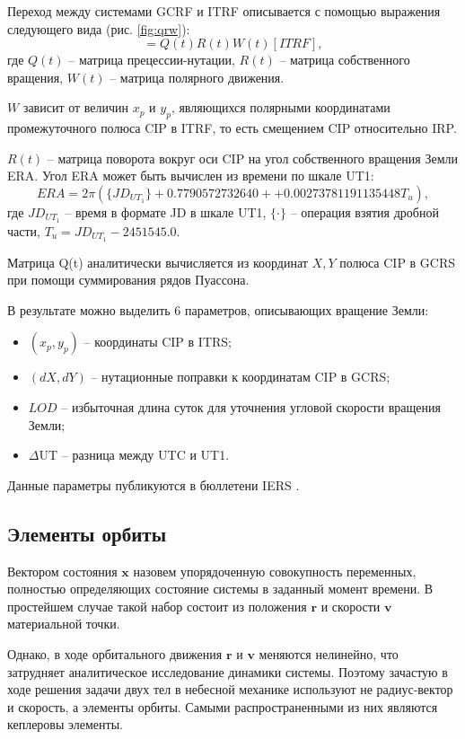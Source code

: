 Переход между системами GCRF и ITRF описывается с помощью выражения следующего вида (рис. \ref{fig:qrw}):
\begin{equation*}
    [GCRF] = Q(t) R(t) W (t) [ITRF],
\end{equation*}
где $Q(t)$ -- матрица прецессии-нутации, $R(t)$ -- матрица собственного вращения, 
$W(t)$ -- матрица полярного движения.

$W$ зависит от величин $x_p$ и $y_p$, являющихся полярными координатами промежуточного
полюса CIP в ITRF, то есть смещением CIP относительно IRP.

$R(t)$ -- матрица поворота вокруг оси CIP на угол собственного вращения Земли ERA.
Угол ERA может быть вычислен из времени по шкале UT1:
\begin{equation*}
    ERA = 2 \pi (\{JD_{UT_1}\} + 0.7790572732640 + + 0.00273781191135448 T_u),
\end{equation*}
где $JD_{UT_1}$ -- время в формате JD в шкале UT1, $\{\cdot\}$ -- операция взятия дробной части,
$T_u = JD_{UT_1} - 2451545.0$.

Матрица Q(t) аналитически вычисляется из координат $X, Y$ полюса CIP в GCRS при помощи
суммирования рядов Пуассона.

В результате можно выделить 6 параметров, описывающих вращение Земли:
\begin{itemize}
    \item $(x_p, y_p)$ -- координаты CIP в ITRS;
    \item $(dX, dY)$ -- нутационные поправки к координатам CIP в GCRS;
    \item $LOD$ -- избыточная длина суток для уточнения угловой скорости вращения Земли;
    \item $\Delta$UT -- разница между UTC и UT1.
\end{itemize}

Данные параметры публикуются в бюллетени IERS \cite{Petit2010}.

\subsection{Элементы орбиты}
Вектором состояния $\mathbf{x}$ назовем упорядоченную совокупность переменных, полностью определяющих состояние системы в заданный момент времени.
В простейшем случае такой набор состоит из положения $\mathbf{r}$ и скорости $\mathbf{v}$ материальной точки. 

Однако, в ходе орбитального движения $\mathbf{r}$ и $\mathbf{v}$ меняются нелинейно,
что затрудняет аналитическое исследование динамики системы.
Поэтому зачастую в ходе решения задачи двух тел в небесной механике используют не радиус-вектор и скорость, а элементы орбиты.
Самыми распространенными из них являются кеплеровы элементы. 

